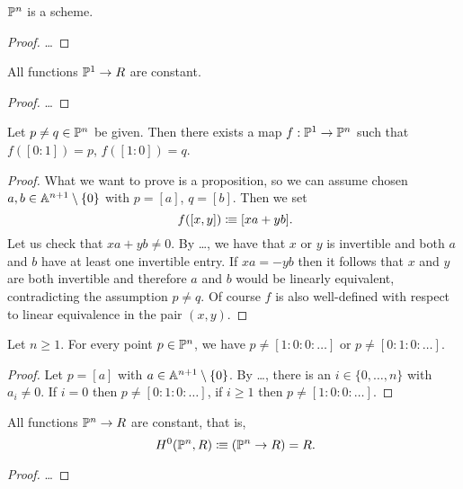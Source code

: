 
\begin{theorem}
  $\mathbb{P}^n$ is a scheme.
\end{theorem}

\begin{proof}
  \dots
\end{proof}

\begin{lemma}
  All functions $\mathbb{P}^1 \to R$ are constant.
\end{lemma}

\begin{proof}
  \dots
\end{proof}

\begin{lemma}
  Let $p \neq q \in \mathbb{P}^n$ be given.
  Then there exists a map $f : \mathbb{P}^1 \to \mathbb{P}^n$
  such that $f([0 : 1]) = p$, $f([1 : 0]) = q$.
\end{lemma}

\begin{proof}
  What we want to prove is a proposition,
  so we can assume chosen $a, b \in \mathbb{A}^{n+1} \setminus \{0\}$
  with $p = [a]$, $q = [b]$.
  Then we set
  \[ f([x, y]) \colonequiv [xa + yb] \rlap{.}\]
  Let us check that $xa + yb \neq 0$.
  By \dots,
  we have that $x$ or $y$ is invertible
  and both $a$ and $b$ have at least one invertible entry.
  If $xa = - yb$
  then it follows that $x$ and $y$ are both invertible
  and therefore $a$ and $b$ would be linearly equivalent,
  contradicting the assumption $p \neq q$.
  Of course $f$ is also well-defined
  with respect to linear equivalence in the pair $(x, y)$.
\end{proof}

\begin{lemma}
  Let $n \geq 1$.
  For every point $p \in \mathbb{P}^n$,
  we have $p \neq [1 : 0 : 0 : \dots]$
  or $p \neq [0 : 1 : 0 : \dots]$.
\end{lemma}

\begin{proof}
  Let $p = [a]$ with $a \in \mathbb{A}^{n+1} \setminus \{0\}$.
  By \dots,
  there is an $i \in \{0, \dots, n\}$ with $a_i \neq 0$.
  If $i = 0$ then $p \neq [0 : 1 : 0 : \dots]$,
  if $i \geq 1$ then $p \neq [1 : 0 : 0 : \dots]$.
\end{proof}

\begin{theorem}
  All functions $\mathbb{P}^n \to R$ are constant,
  that is,
  \[ H^0(\bP^n, R) \colonequiv (\bP^n \to R) = R \rlap{.} \]
\end{theorem}

\begin{proof}
  \dots
\end{proof}

